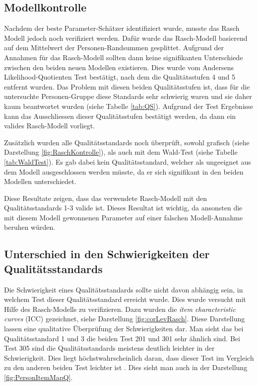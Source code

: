 \subsection{Modellkontrolle}

Nachdem der beste Parameter-Schätzer identifiziert wurde, musste das Rasch Modell jedoch noch verifiziert werden. Dafür wurde das Rasch-Modell basierend auf dem Mittelwert der Personen-Randsummen gesplittet. Aufgrund der Annahmen für das Rasch-Modell sollten dann keine signifikanten Unterschiede zwischen den beiden neuen Modellen existieren. Dies wurde vom Andersens Likelihood-Quotienten Test bestätigt, nach dem die Qualitätsstufen 4 und 5 entfernt wurden. Das Problem mit diesen beiden Qualitätsstufen ist, dass für die untersuchte Personen-Gruppe diese Standards sehr schwierig waren und sie daher kaum beantwortet wurden (siehe Tabelle \ref{tab:QS}). Aufgrund der Test Ergebnisse kann das Ausschliessen dieser Qualitätsstufen bestätigt werden, da dann ein valides Rasch-Modell vorliegt.

Zusätzlich wurden alle Qualitätsstandards noch überprüft, sowohl grafisch (siehe Darstellung \ref{fig:RaschKontrolle}), als auch mit dem Wald-Test (siehe Tabelle \ref{tab:WaldTest}). Es gab dabei kein Qualitätsstandard, welcher als ungeeignet aus dem Modell ausgeschlossen werden müsste, da er sich signifikant in den beiden Modellen unterschiedet.

Diese Resultate zeigen, dass das verwendete Rasch-Modell mit den Qualitätsstandards 1-3 valide ist. Dieses Resultat ist wichtig, da ansonsten die mit diesem Modell gewonnenen Parameter auf einer falschen Modell-Annahme beruhen würden.

\subsection{Unterschied in den Schwierigkeiten der Qualitätsstandards}

Die Schwierigkeit eines Qualitätsstandards sollte nicht davon abhängig sein, in welchem Test dieser Qualitätsstandard erreicht wurde. Dies wurde versucht mit Hilfe des Rasch-Modells zu verifizieren. Dazu wurden die \textit{item characteristic curves} (ICC) gezeichnet, siehe Darstellung \ref{fig:corLevRasch}. Diese Darstellung lassen eine qualitative Überprüfung der Schwierigkeiten dar. Man sieht das bei Qualitätsstandard 1 und 3 die beiden Test 201 und 301 sehr ähnlich sind. Bei Test 305 sind die Qualitätsstandards meistens deutlich leichter in der Schwierigkeit. Dies liegt höchstwahrscheinlich daran, dass dieser Test im Vergleich zu den anderen beiden Test leichter ist \citep{Sichau2015}. Dies sieht man auch in der Darstellung \ref{fig:PersonItemMapQ}.

